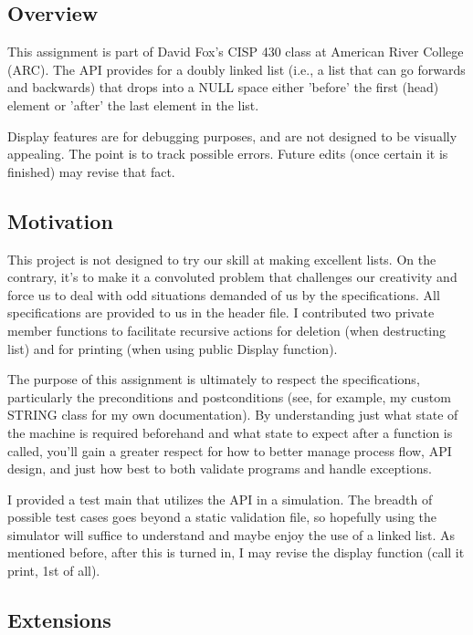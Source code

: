 \subsection*{Overview }

This assignment is part of David Fox's C\-I\-S\-P 430 class at American River College (A\-R\-C). The A\-P\-I provides for a doubly linked list (i.\-e., a list that can go forwards and backwards) that drops into a N\-U\-L\-L space either 'before' the first (head) element or 'after' the last element in the list.

Display features are for debugging purposes, and are not designed to be visually appealing. The point is to track possible errors. Future edits (once certain it is finished) may revise that fact.

\subsection*{Motivation }

This project is not designed to try our skill at making excellent lists. On the contrary, it's to make it a convoluted problem that challenges our creativity and force us to deal with odd situations demanded of us by the specifications. All specifications are provided to us in the header file. I contributed two private member functions to facilitate recursive actions for deletion (when destructing list) and for printing (when using public Display function).

The purpose of this assignment is ultimately to respect the specifications, particularly the preconditions and postconditions (see, for example, my custom S\-T\-R\-I\-N\-G class for my own documentation). By understanding just what state of the machine is required beforehand and what state to expect after a function is called, you'll gain a greater respect for how to better manage process flow, A\-P\-I design, and just how best to both validate programs and handle exceptions.

I provided a test main that utilizes the A\-P\-I in a simulation. The breadth of possible test cases goes beyond a static validation file, so hopefully using the simulator will suffice to understand and maybe enjoy the use of a linked list. As mentioned before, after this is turned in, I may revise the display function (call it print, 1st of all).

\subsection*{Extensions }

